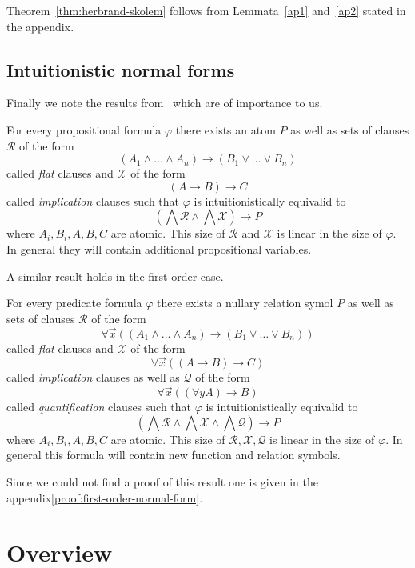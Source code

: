 \documentclass[runningheads]{llncs}
\begin{document}
Theorem~\ref{thm:herbrand-skolem} follows from Lemmata~\ref{ap1} and~\ref{ap2} stated in the appendix.

\subsection{Intuitionistic normal forms}

Finally we note the results from~\cite{otten2005clausal} which are of importance to us.

\begin{lemma}\label{lemma:propositional-normal-form}
	For every propositional formula $\varphi$ there exists an atom $P$ as well as sets of clauses $\mathcal R$ of the form
	$$(A_1\wedge\dots\wedge A_n)\to (B_1\vee\dots\vee B_n)$$
	called \emph{flat} clauses and $\mathcal X$ of the form
	$$(A\to B)\to C$$
	called \emph{implication} clauses such that $\varphi$ is intuitionistically equivalid to
	$$\left(\bigwedge\mathcal R\wedge\bigwedge\mathcal X\right)\to P$$where $A_i, B_i, A, B, C$ are atomic. This size of $\mathcal R$ and $\mathcal X$ is linear in the size of $\varphi$. In general they will contain additional propositional variables.
\end{lemma}

A similar result holds in the first order case.

\begin{lemma}\label{lemma:first-order-normal-form}
	For every predicate formula $\varphi$ there exists a nullary relation symol $P$ as well as sets of clauses $\mathcal R$ of the form
	$$\forall \vec x\left((A_1\wedge\dots\wedge A_n)\to (B_1\vee\dots\vee B_n)\right)$$
	called \emph{flat} clauses and $\mathcal X$ of the form
	$$\forall \vec x\left((A\to B)\to C\right)$$
	called \emph{implication} clauses as well as $\mathcal Q$ of the form
	$$\forall\vec x\left((\forall y A)\to B\right)$$
	called \emph{quantification} clauses such that $\varphi$ is intuitionistically equivalid to
	$$\left(\bigwedge\mathcal R\wedge\bigwedge \mathcal X\wedge\bigwedge\mathcal Q\right)\to P$$where $A_i, B_i, A, B, C$ are atomic. This size of $\mathcal R, \mathcal X, \mathcal Q$ is linear in the size of $\varphi$. In general this formula will contain new function and relation symbols.
\end{lemma}

Since we could not find a proof of this result one is given in the appendix\ref{proof:first-order-normal-form}.

\section{Overview}
\end{document}
